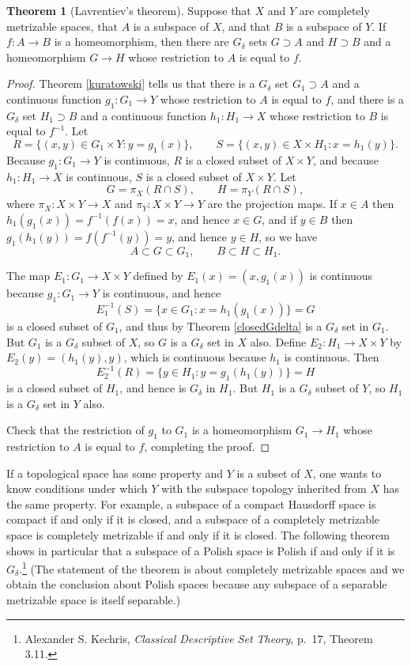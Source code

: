 \documentclass{article}
\theoremstyle{definition}
\newtheorem{theorem}{Theorem}
\theoremstyle{definition}
\begin{document}
\begin{theorem}[Lavrentiev's theorem]
Suppose that $X$ and $Y$ are completely metrizable spaces, that $A$ is a subspace of $X$, and that $B$ is a subspace of $Y$. If $f:A \to B$
is a homeomorphism, then there are $G_\delta$ sets $G \supset A$ and $H \supset B$ and a homeomorphism $G \to H$ whose restriction
to $A$ is equal to $f$.
\label{lavrentiev}
\end{theorem}
\begin{proof}
Theorem \ref{kuratowski} tells us that there is a $G_\delta$ set $G_1 \supset A$ and a continuous function
$g_1:G_1 \to Y$ whose restriction to $A$ is equal to $f$, and there is a $G_\delta$ set $H_1 \supset B$ and a continuous function
$h_1:H_1 \to X$ whose restriction to $B$ is equal to $f^{-1}$. 
Let
\[
R = \{(x,y) \in G_1 \times Y: y=g_1(x)\}, \qquad S = \{(x,y) \in X \times H_1 : x=h_1(y)\}.
\]
Because $g_1:G_1 \to Y$ is continuous,
$R$ is a closed subset of $X \times Y$, and because $h_1:H_1 \to X$ is continuous, $S$ is a closed subset of $X \times Y$.
Let
\[
G = \pi_X(R \cap S), \qquad H = \pi_Y(R \cap S),
\]
where $\pi_X:X \times Y \to X$ and $\pi_Y:X \times Y \to Y$ are the projection maps. 
If $x \in A$ then $h_1(g_1(x))=f^{-1}(f(x))=x$, and hence $x \in G$, and if $y \in B$ then $g_1(h_1(y))=f(f^{-1}(y))=y$, and hence
$y \in H$, so we have
\[
A \subset G \subset G_1, \qquad B \subset H \subset H_1.
\]

The map 
$E_1:G_1 \to X \times Y$ defined by $E_1(x) = (x,g_1(x))$ is continuous because $g_1:G_1 \to Y$ is continuous, and hence
\[
E_1^{-1}(S)=\{x \in G_1: x = h_1(g_1(x))\}=G
\] 
is a closed subset of $G_1$, and thus by Theorem \ref{closedGdelta} is a $G_\delta$ set in $G_1$. But $G_1$ is a $G_\delta$
subset of $X$, so $G$ is a $G_\delta$ set in $X$ also.
Define $E_2:H_1 \to X \times Y$ by $E_2(y)=(h_1(y),y)$, which is continuous because $h_1$
is continuous. Then
\[
E_2^{-1}(R) = \{y \in H_1: y=g_1(h_1(y))\} = H
\]
is a closed subset of $H_1$, and hence is $G_\delta$ in $H_1$.
But $H_1$ is a $G_\delta$ subset of $Y$, so $H_1$ is a $G_\delta$ set in $Y$ also.

Check  that the restriction of $g_1$ to $G_1$ is a homeomorphism $G_1 \to H_1$ whose restriction
to $A$ is equal to $f$, completing the proof.
\end{proof}


If a topological space has some property and $Y$ is a subset of $X$, one wants to know conditions under which $Y$ with the subspace
topology inherited from $X$ has the same property.
For example, a subspace of a compact Hausdorff space is compact if and only if it is closed, and a subspace of a completely metrizable space
is completely metrizable if and only if it is  closed.
The following theorem shows in particular that a subspace of a Polish space is Polish if and only if it is $G_\delta$.\footnote{Alexander S. Kechris, {\em Classical Descriptive Set Theory}, p.~17, Theorem 3.11.} (The statement
of the theorem is about completely metrizable spaces and we obtain the conclusion about Polish spaces because any subspace
of a separable metrizable space is itself separable.)
\end{document}
